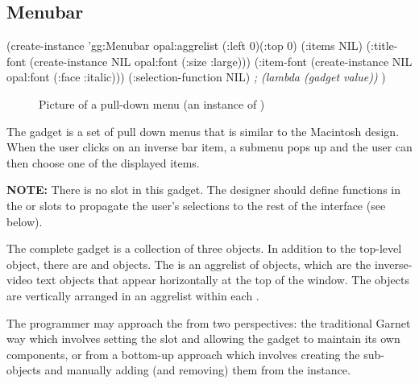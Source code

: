 \begin{group}
\section{Menubar}
\label{menubar}

\begin{programexample}
(create-instance 'gg:Menubar opal:aggrelist
   (:left 0)(:top 0)
   (:items NIL)
   (:title-font (create-instance NIL opal:font (:size :large)))
   (:item-font (create-instance NIL opal:font (:face :italic)))
   (:selection-function NIL)   {\it ; (lambda (gadget value))}
   )
\end{programexample}
\end{group}

\begin{figure}
\begin{center}
\end{center}
\caption{Picture of a pull-down menu (an instance of )}
\end{figure}

The  gadget is a set of pull down menus that is similar to
the Macintosh design.  When the user clicks on an inverse bar item,
a submenu pops up and the user can then choose one of the displayed
items.

{\bf NOTE:}  There is no  slot in this gadget.  The designer should
define functions in the  or  slots to
propagate the user's selections to the rest of the interface (see below).

The complete  gadget is a collection of three objects.
In addition to the top-level  object, there are 
and  objects.  The  is an aggrelist of
 objects, which are the inverse-video text objects that appear
horizontally at the top of the window.  The  objects are
vertically arranged in an aggrelist within each .

The programmer may approach the  from two perspectives:  the
traditional Garnet way which involves setting the  slot and allowing
the gadget to maintain its own components, or from a bottom-up approach which
involves creating the sub-objects and manually adding (and removing) them
from the  instance.

